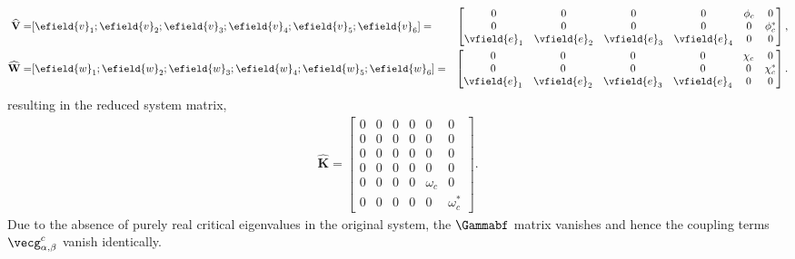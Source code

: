  \begin{align}
 	\mathbf{\widehat{V}} =& [\efield{v}_{1};\efield{v}_{2};\efield{v}_{3};\efield{v}_{4};\efield{v}_{5};\efield{v}_{6}] =&
 	\begin{bmatrix}
        0 	    	      &  0		            &  0              &  0              &  \phi_{c} &  0              \\
        0		      &  0		            &  0              &  0              &  0        &  \phi^{*}_{c}   \\
 	  \vfield{e}_{1}  &  \vfield{e}_{2}       &  \vfield{e}_{3} &  \vfield{e}_{4} &  0        &  0              \\
 	\end{bmatrix}, \nonumber \\
 	\mathbf{\widehat{W}} =&
 	[\efield{w}_{1};\efield{w}_{2};\efield{w}_{3};\efield{w}_{4};\efield{w}_{5};\efield{w}_{6}] =&
 	\begin{bmatrix}
        0 	    	      &  0		            &  0              &  0              &  \chi_{c} &  0              \\
        0		      &  0		            &  0              &  0              &  0        &  \chi^{*}_{c}   \\
 	  \vfield{e}_{1}  &  \vfield{e}_{2}       &  \vfield{e}_{3} &  \vfield{e}_{4} &  0        &  0              \\
 	\end{bmatrix}. \nonumber
 \end{align}
resulting in the reduced system matrix,
\begin{align}
	\mathbf{\widehat{K}} = \begin{bmatrix}
		0 & 0 & 0 & 0 & 0& 0 \\ 
		0 & 0 & 0 & 0 & 0& 0 \\ 
		0 & 0 & 0 & 0 & 0& 0 \\ 
		0 & 0 & 0 & 0 & 0& 0 \\ 
		0 & 0 & 0 & 0 & \omega_{c} & 0 \\ 
		0 & 0 & 0 & 0 & 0 & \omega^{*}_{c}
	\end{bmatrix}. \nonumber
\end{align}
Due to the absence of purely real critical eigenvalues in the original system, the $\Gammabf$ matrix vanishes and hence the coupling terms $\vecg^{c}_{\alpha,\beta}$ vanish identically. 

